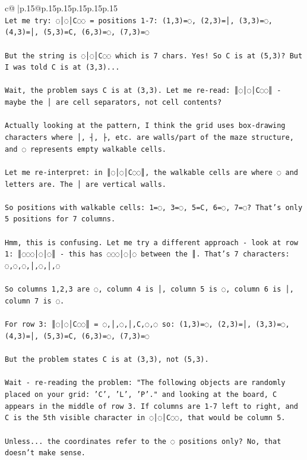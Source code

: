 \documentclass{article}
\begin{document}
{\begin{supertabular}{c@{$\;$}|p{.15\linewidth}@{}p{.15\linewidth}p{.15\linewidth}p{.15\linewidth}p{.15\linewidth}p{.15\linewidth}}
{{{\\ 
\texttt{Let me try: ◌│◌│C◌◌ = positions 1{-}7: (1,3)=◌, (2,3)=│, (3,3)=◌, (4,3)=│, (5,3)=C, (6,3)=◌, (7,3)=◌} \\
\\ 
\texttt{But the string is ◌│◌│C◌◌ which is 7 chars. Yes! So C is at (5,3)? But I was told C is at (3,3)...} \\
\\ 
\texttt{Wait, the problem says C is at (3,3). Let me re{-}read: ║◌│◌│C◌◌║ {-} maybe the │ are cell separators, not cell contents?} \\
\\ 
\texttt{Actually looking at the pattern, I think the grid uses box{-}drawing characters where │, ┤, ├, etc. are walls/part of the maze structure, and ◌ represents empty walkable cells.} \\
\\ 
\texttt{Let me re{-}interpret: in ║◌│◌│C◌◌║, the walkable cells are where ◌ and letters are. The │ are vertical walls.} \\
\\ 
\texttt{So positions with walkable cells: 1=◌, 3=◌, 5=C, 6=◌, 7=◌? That's only 5 positions for 7 columns.} \\
\\ 
\texttt{Hmm, this is confusing. Let me try a different approach {-} look at row 1: ║◌◌◌│◌│◌║ {-} this has ◌◌◌│◌│◌ between the ║. That's 7 characters: ◌,◌,◌,│,◌,│,◌} \\
\\ 
\texttt{So columns 1,2,3 are ◌, column 4 is │, column 5 is ◌, column 6 is │, column 7 is ◌.} \\
\\ 
\texttt{For row 3: ║◌│◌│C◌◌║ = ◌,│,◌,│,C,◌,◌ so: (1,3)=◌, (2,3)=│, (3,3)=◌, (4,3)=│, (5,3)=C, (6,3)=◌, (7,3)=◌} \\
\\ 
\texttt{But the problem states C is at (3,3), not (5,3). } \\
\\ 
\texttt{Wait {-} re{-}reading the problem: "The following objects are randomly placed on your grid: 'C', 'L', 'P'." and looking at the board, C appears in the middle of row 3. If columns are 1{-}7 left to right, and C is the 5th visible character in ◌│◌│C◌◌, that would be column 5.} \\
\\ 
\texttt{Unless... the coordinates refer to the ◌ positions only? No, that doesn't make sense.} \\
}}}
\end{supertabular}}
\end{document}
